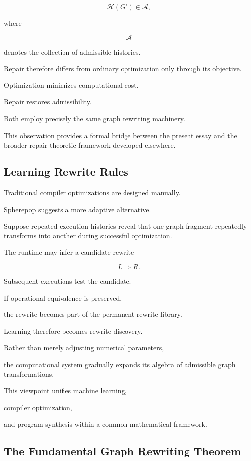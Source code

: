 \documentclass[12pt,oneside]{article}
\begin{document}
\[
\mathcal H(G')
\in
\mathcal A,
\]

where

\[
\mathcal A
\]

denotes the collection of admissible histories.

Repair therefore differs from ordinary optimization only through its objective.

Optimization minimizes computational cost.

Repair restores admissibility.

Both employ precisely the same graph rewriting machinery.

This observation provides a formal bridge between the present essay and the broader repair-theoretic framework developed elsewhere.

\subsection{Learning Rewrite Rules}

Traditional compiler optimizations are designed manually.

Spherepop suggests a more adaptive alternative.

Suppose repeated execution histories reveal that one graph fragment repeatedly transforms into another during successful optimization.

The runtime may infer a candidate rewrite

\[
L
\Longrightarrow
R.
\]

Subsequent executions test the candidate.

If operational equivalence is preserved,

the rewrite becomes part of the permanent rewrite library.

Learning therefore becomes rewrite discovery.

Rather than merely adjusting numerical parameters,

the computational system gradually expands its algebra of admissible graph transformations.

This viewpoint unifies machine learning,

compiler optimization,

and program synthesis within a common mathematical framework.

\subsection{The Fundamental Graph Rewriting Theorem}
\end{document}

